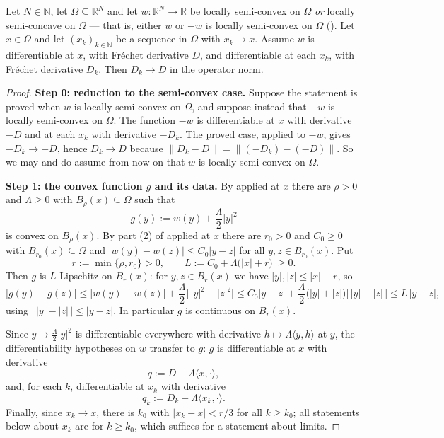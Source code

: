 \begin{theorem}
Let $N\in\mathbb N$, let $\Omega\subseteq\mathbb R^{N}$ and let
$w:\mathbb R^{N}\to\mathbb R$ be locally semi-convex on $\Omega$ \emph{or} locally
semi-concave on $\Omega$ --- that is, either $w$ or $-w$ is locally semi-convex on $\Omega$
(). Let $x\in\Omega$ and let $(x_k)_{k\in\mathbb N}$ be a
sequence in $\Omega$ with $x_k\to x$. Assume $w$ is differentiable at $x$, with Fr\'echet
derivative $D$, and differentiable at each $x_k$, with Fr\'echet derivative $D_k$. Then
$D_k\to D$ in the operator norm.
\end{theorem}
\begin{proof}
\noindent\textbf{Step 0: reduction to the semi-convex case.} Suppose the statement is proved
when $w$ is locally semi-convex on $\Omega$, and suppose instead that $-w$ is locally
semi-convex on $\Omega$. The function $-w$ is differentiable at $x$ with derivative $-D$ and
at each $x_k$ with derivative $-D_k$. The proved case, applied to $-w$, gives
$-D_k\to-D$, hence $D_k\to D$ because $\|D_k-D\|=\|(-D_k)-(-D)\|$. So we may and do assume
from now on that $w$ is locally semi-convex on $\Omega$.

\medskip\noindent\textbf{Step 1: the convex function $g$ and its data.} By
 applied at $x$ there are $\rho>0$ and $\Lambda\ge0$ with
$B_\rho(x)\subseteq\Omega$ such that
\[
 g(y):=w(y)+\frac{\Lambda}{2}|y|^{2}
\]
is convex on $B_\rho(x)$. By part (2) of  applied at $x$
there are $r_0>0$ and $C_0\ge0$ with $B_{r_0}(x)\subseteq\Omega$ and
$|w(y)-w(z)|\le C_0|y-z|$ for all $y,z\in B_{r_0}(x)$. Put
\[
 r:=\min\{\rho,r_0\}>0,\qquad L:=C_0+\Lambda\big(|x|+r\big)\ \ge0 .
\]
Then $g$ is $L$-Lipschitz on $B_r(x)$: for $y,z\in B_r(x)$ we have $|y|,|z|\le|x|+r$, so
\[
 |g(y)-g(z)|\le|w(y)-w(z)|+\frac{\Lambda}{2}\big|\,|y|^{2}-|z|^{2}\big|
  \le C_0|y-z|+\frac{\Lambda}{2}\big(|y|+|z|\big)\big|\,|y|-|z|\,\big|
  \le L\,|y-z| , \tag{1}
\]
using $\big|\,|y|-|z|\,\big|\le|y-z|$. In particular $g$ is continuous on $B_r(x)$.

Since $y\mapsto\tfrac{\Lambda}{2}|y|^{2}$ is differentiable everywhere with derivative
$h\mapsto\Lambda\langle y,h\rangle$ at $y$, the differentiability hypotheses on $w$ transfer
to $g$: $g$ is differentiable at $x$ with derivative
\[
 q:=D+\Lambda\langle x,\cdot\rangle ,
\]
and, for each $k$, differentiable at $x_k$ with derivative
\[
 q_k:=D_k+\Lambda\langle x_k,\cdot\rangle . \tag{2}
\]
Finally, since $x_k\to x$, there is $k_0$ with $|x_k-x|<r/3$ for all $k\ge k_0$; all
statements below about $x_k$ are for $k\ge k_0$, which suffices for a statement about limits.


\end{proof}
